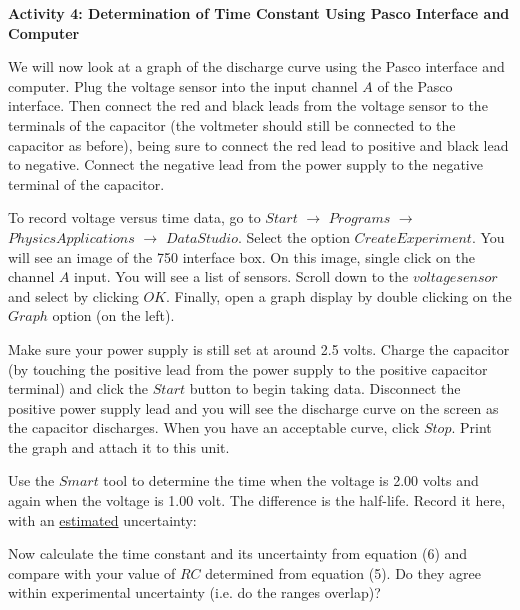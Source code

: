 \newpage

\textbf{Activity 4: Determination of Time Constant Using Pasco Interface and Computer}

We will now look at a graph of the discharge curve using the Pasco interface 
and computer. Plug the voltage sensor into the input channel $A$ of the Pasco 
interface. Then connect the red and black leads from the voltage sensor to the 
terminals of the capacitor (the voltmeter should still be connected to the 
capacitor as before), being sure to connect the red lead to positive and black 
lead to negative. Connect the negative lead from the power supply to the 
negative terminal of the capacitor.
\vspace{10mm}

To record voltage versus time data, go to $Start$ $\rightarrow$ $Programs$ 
$\rightarrow$ $Physics Applications$ $\rightarrow$ $Data Studio$. Select the 
option $Create Experiment$. You will see an image of the 750 interface box. 
On this image, single click on the channel $A$ input. You will see a list of 
sensors. Scroll down to the $voltage sensor$ and select by clicking $OK$. 
Finally, open a graph display by double clicking on the $Graph$ option (on 
the left).
\vspace{10mm}

Make sure your power supply is still set at around 2.5 volts. Charge the 
capacitor (by touching the positive lead from the power supply to the positive 
capacitor terminal) and click the $Start$ button to begin taking data. 
Disconnect the positive power supply lead and you will see the 
discharge curve on the screen as the capacitor discharges. When you have an 
acceptable curve, click $Stop$. Print the graph and attach it to this unit.
\vspace{10mm}

Use the $Smart$ tool to determine the time when the voltage is 2.00 volts 
and again when the voltage is 1.00 volt. The difference is the half-life. 
Record it here, with an \underline{estimated} uncertainty:
\vspace{40mm}

Now calculate the time constant and its uncertainty from equation (6) and 
compare with your value of $RC$ determined from equation (5). Do they agree 
within experimental uncertainty (i.e. do the ranges overlap)?

